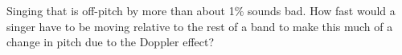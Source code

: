 Singing that is off-pitch by more than about 1\% sounds
bad. How fast would a singer have to be moving relative to
the rest of a band to make this much of a change in pitch
due to the Doppler effect?
